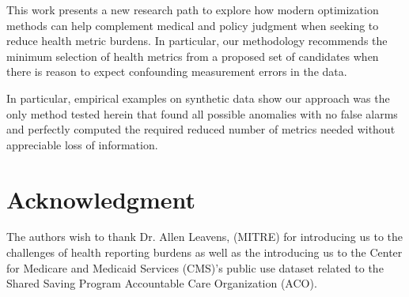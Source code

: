 \documentclass[conference]{IEEEtran}
\begin{document}
This work presents a new research path to explore how modern optimization methods can help complement medical and policy judgment when seeking to reduce health metric burdens.  In particular, our methodology recommends  the minimum selection of health metrics from a proposed set of candidates when there is reason to expect confounding measurement errors in the data.

In particular, empirical examples on synthetic data show our approach was the only method tested herein that found all possible anomalies with no false alarms and perfectly computed the required reduced number of metrics needed without appreciable loss of information. 



\section{Acknowledgment}
The authors wish to thank Dr. Allen Leavens, (MITRE) for introducing us to the challenges of health reporting burdens as well as the introducing us to the Center for Medicare and Medicaid Services (CMS)'s public use dataset related to the Shared Saving Program Accountable Care Organization (ACO).  

\clearpage







\newpage
\listoftodos[Notes]
\end{document}
